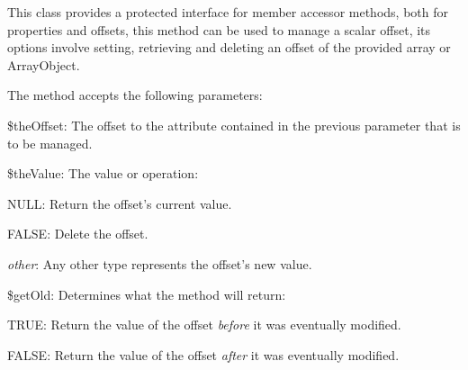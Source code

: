 This class provides a protected interface for member accessor methods, both for properties and offsets, this method can be used to manage a scalar offset, its options involve setting, retrieving and deleting an offset of the provided array or Array\-Object.

The method accepts the following parameters\-:


\begin{DoxyItemize}
\item {\ttfamily \$the\-Offset}\-: The offset to the attribute contained in the previous parameter that is to be managed. 
\item {\ttfamily \$the\-Value}\-: The value or operation\-: 
\begin{DoxyItemize}
\item {\ttfamily N\-U\-L\-L}\-: Return the offset's current value. 
\item {\ttfamily F\-A\-L\-S\-E}\-: Delete the offset. 
\item {\itshape other}\-: Any other type represents the offset's new value. 
\end{DoxyItemize}
\item {\ttfamily \$get\-Old}\-: Determines what the method will return\-: 
\begin{DoxyItemize}
\item {\ttfamily T\-R\-U\-E}\-: Return the value of the offset {\itshape before} it was eventually modified. 
\item {\ttfamily F\-A\-L\-S\-E}\-: Return the value of the offset {\itshape after} it was eventually modified. 
\end{DoxyItemize}
\end{DoxyItemize}



